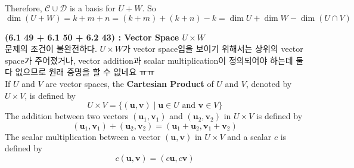 Therefore, $\mathcal{C} \cup \mathcal{D}$ is a basis for $U + W$. So \begin{equation*}
	\dim(U + W) = k + m + n = (k + m) + (k + n) - k = \dim U + \dim W - \dim(U \cap V)
\end{equation*}

\textbf{(6.1 49 + 6.1 50 + 6.2 43) : Vector Space $U \times W$} \\
문제의 조건이 불완전하다. $U \times W$가 vector space임을 보이기 위해서는 상위의 vector space가 주어졌거나, vector addition과 scalar multiplication이 정의되어야 하는데 둘 다 없으므로 원래 증명을 할 수 없네요 ㅠㅠ \\

If $U$ and $V$ are vector spaces, the \textbf{Cartesian Product} of $U$ and $V$, denoted by $U \times V$, is defined by \begin{equation*}
	U \times V = \{ (\textbf{u}, \textbf{v}) \mid \textbf{u} \in U \mbox{ and } \textbf{v} \in V \}
\end{equation*}
The addition between two vectors $(\textbf{u}_1, \textbf{v}_1)$ and $(\textbf{u}_2, \textbf{v}_2)$ in $U \times V$ is defined by \begin{equation*}
	(\textbf{u}_1, \textbf{v}_1) + (\textbf{u}_2, \textbf{v}_2) = (\textbf{u}_1 + \textbf{u}_2, \textbf{v}_1 + \textbf{v}_2)
\end{equation*}
The scalar multiplication between a vector $(\textbf{u}, \textbf{v})$ in $U \times V$ and a scalar $c$ is defined by \begin{equation*}
	c(\textbf{u}, \textbf{v}) = (c\textbf{u}, c\textbf{v})
\end{equation*}

